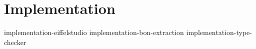 \chapter{Implementation}
{implementation-eiffelstudio}
{implementation-bon-extraction}
{implementation-type-checker}
